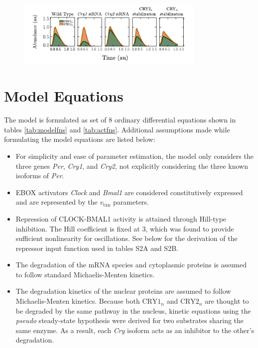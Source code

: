 \begin{figure}[bt]
  \centering
  \begin{minipage}{0.9\textwidth}
    \centering
    \includegraphics[width=0.8\textwidth]{chap2/figures/nucleartimecourse.pdf}
    \label{fig:nucleartimecourse}
  \end{minipage}
\end{figure}

\section{Model Equations}
The model is formulated as set of 8 ordinary differential equations shown in tables \ref{tab:modelfns} and \ref{tab:actfns}. Additional assumptions made while formulating the model equations are listed below:

\begin{itemize}

  \item For simplicity and  ease of parameter estimation, the model only considers the three genes {\it Per}, {\it Cry1}, and {\it Cry2}, not explicitly considering the three known isoforms of {\it Per}. 

  \item EBOX activators {\it Clock} and {\it Bmal1} are considered constitutively expressed and are represented by the $v_{\text{txn}}$ parameters. 

  \item Repression of CLOCK-BMAL1 activity is attained through Hill-type inhibition. The Hill coefficient is fixed at 3, which was found to provide sufficient nonlinearity for oscillations. See below for the derivation of the repressor input function used in tables S2A and S2B.

  \item The degradation of the mRNA species and cytoplasmic proteins is assumed to follow standard Michaelis-Menten kinetics.

  \item The degradation kinetics of the nuclear proteins are assumed to follow Michaelis-Menten kinetics. Because both $\text{CRY1}_n$ and $\text{CRY2}_n$ are thought to be degraded by the same pathway in the nucleus, kinetic equations using the {\it pseudo} steady-state hypothesis were derived for two substrates sharing the same enzyme. As a result, each {\it Cry} isoform acts as an inhibitor to the other's degradation.
\end{itemize}

